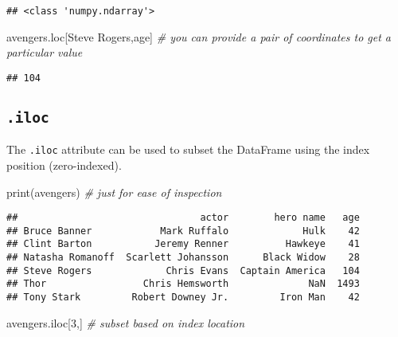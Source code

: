\documentclass[
]{book}
\newenvironment{Shaded}{\begin{snugshade}}{\end{snugshade}}
\newcommand{\BuiltInTok}[1]{#1}
\newcommand{\CommentTok}[1]{\textcolor[rgb]{0.56,0.35,0.01}{\textit{#1}}}
\newcommand{\DecValTok}[1]{\textcolor[rgb]{0.00,0.00,0.81}{#1}}
\newcommand{\NormalTok}[1]{#1}
\newcommand{\StringTok}[1]{\textcolor[rgb]{0.31,0.60,0.02}{#1}}
\begin{document}
\begin{verbatim}
## <class 'numpy.ndarray'>
\end{verbatim}

\begin{Shaded}
\begin{Highlighting}[]
\NormalTok{avengers.loc[}\StringTok{\textquotesingle{}Steve Rogers\textquotesingle{}}\NormalTok{,}\StringTok{\textquotesingle{}age\textquotesingle{}}\NormalTok{]  }\CommentTok{\# you can provide a pair of \textquotesingle{}coordinates\textquotesingle{} to get a particular value}
\end{Highlighting}
\end{Shaded}

\begin{verbatim}
## 104
\end{verbatim}

\hypertarget{iloc}{%
\subsection{\texorpdfstring{\texttt{.iloc}}{.iloc}}\label{iloc}}

The \texttt{.iloc} attribute can be used to subset the DataFrame using the index position (zero-indexed).

\begin{Shaded}
\begin{Highlighting}[]
\BuiltInTok{print}\NormalTok{(avengers) }\CommentTok{\# just for ease of inspection}
\end{Highlighting}
\end{Shaded}

\begin{verbatim}
##                                actor        hero name   age
## Bruce Banner            Mark Ruffalo             Hulk    42
## Clint Barton           Jeremy Renner          Hawkeye    41
## Natasha Romanoff  Scarlett Johansson      Black Widow    28
## Steve Rogers             Chris Evans  Captain America   104
## Thor                 Chris Hemsworth              NaN  1493
## Tony Stark         Robert Downey Jr.         Iron Man    42
\end{verbatim}

\begin{Shaded}
\begin{Highlighting}[]
\NormalTok{avengers.iloc[}\DecValTok{3}\NormalTok{,] }\CommentTok{\# subset based on index location}
\end{Highlighting}
\end{Shaded}
\end{document}

